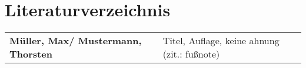 \section{Literaturverzeichnis}

\begin{tabular}{R{5 cm}R{10 cm}}
    \textbf{Müller, Max/ Mustermann, Thorsten} & Titel, Auflage, keine ahnung (zit.: fußnote) \\
\end{tabular}